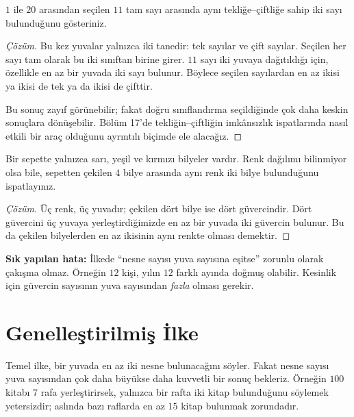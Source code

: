\begin{example}
$1$ ile $20$ arasından seçilen $11$ tam sayı arasında aynı tekliğe--çiftliğe sahip iki sayı bulunduğunu gösteriniz.
\end{example}
\begin{proof}[Çözüm]
Bu kez yuvalar yalnızca iki tanedir: tek sayılar ve çift sayılar. Seçilen her sayı tam olarak bu iki sınıftan birine girer. $11$ sayı iki yuvaya dağıtıldığı için, özellikle en az bir yuvada iki sayı bulunur. Böylece seçilen sayılardan en az ikisi ya ikisi de tek ya da ikisi de çifttir.

Bu sonuç zayıf görünebilir; fakat doğru sınıflandırma seçildiğinde çok daha keskin sonuçlara dönüşebilir. Bölüm 17'de tekliğin--çiftliğin imkânsızlık ispatlarında nasıl etkili bir araç olduğunu ayrıntılı biçimde ele alacağız.
\end{proof}

\begin{example}
Bir sepette yalnızca sarı, yeşil ve kırmızı bilyeler vardır. Renk dağılımı bilinmiyor olsa bile, sepetten çekilen $4$ bilye arasında aynı renk iki bilye bulunduğunu ispatlayınız.
\end{example}
\begin{proof}[Çözüm]
Üç renk, üç yuvadır; çekilen dört bilye ise dört güvercindir. Dört güvercini üç yuvaya yerleştirdiğimizde en az bir yuvada iki güvercin bulunur. Bu da çekilen bilyelerden en az ikisinin aynı renkte olması demektir.
\end{proof}

\textbf{Sık yapılan hata:} İlkede ``nesne sayısı yuva sayısına eşitse'' zorunlu olarak çakışma olmaz. Örneğin $12$ kişi, yılın $12$ farklı ayında doğmuş olabilir. Kesinlik için güvercin sayısının yuva sayısından \emph{fazla} olması gerekir.

\section{Genelleştirilmiş İlke}

Temel ilke, bir yuvada en az iki nesne bulunacağını söyler. Fakat nesne sayısı yuva sayısından çok daha büyükse daha kuvvetli bir sonuç bekleriz. Örneğin $100$ kitabı $7$ rafa yerleştirirsek, yalnızca bir rafta iki kitap bulunduğunu söylemek yetersizdir; aslında bazı raflarda en az $15$ kitap bulunmak zorundadır.

